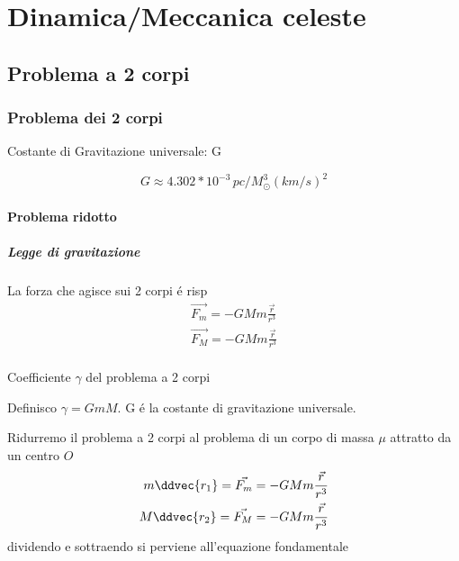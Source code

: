 
\part{Dinamica/Meccanica celeste}

\chapter{Problema a 2 corpi}
\PartialToc

\section{Problema dei 2 corpi}



\begin{usefull}{Costante di Gravitazione universale: G}

\begin{equation*}
G\approx4.302*10^{-3}\,pc/M_{\odot}^{3}(km/s)^2
\end{equation*}

\end{usefull}

\subsection{Problema ridotto}


\subsubsection{Legge di gravitazione}

La forza che agisce sui 2 corpi \'e risp
\begin{align*}
\vec{F_m}=-GMm\frac{\vec{r}}{r^3}\\
\vec{F_M}=-GMm\frac{\vec{r}}{r^3}\\
\end{align*}

\begin{definition}{Coefficiente $\gamma$ del problema a 2 corpi}

Definisco $\gamma=GmM$. G \'e la costante di gravitazione universale.

\end{definition}


Ridurremo il problema a 2 corpi al problema di un corpo di massa $\mu$ attratto da un centro $O$
\begin{align*}
m\ddvec{r_1}=\vec{F_m}=-GMm\frac{\vec{r}}{r^3}\\
M\ddvec{r_2}=\vec{F_M}=-GMm\frac{\vec{r}}{r^3}\\
\end{align*}
dividendo e sottraendo si perviene all'equazione fondamentale

